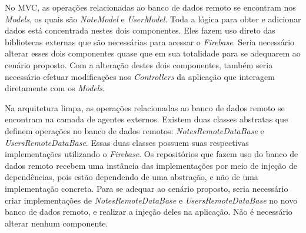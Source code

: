 No MVC, as operações relacionadas ao banco de dados remoto se encontram nos \emph{Models}, os quais são \emph{NoteModel} e \emph{UserModel}.
Toda a lógica para obter e adicionar dados está concentrada nestes dois componentes.
Eles fazem uso direto das bibliotecas externas que são necessárias para acessar o \emph{Firebase}.
Seria necessário alterar esses dois componentes quase que em sua totalidade para se adequarem ao cenário proposto.
Com a alteração destes dois componentes, também seria necessário efetuar modificações nos \emph{Controllers} da aplicação que interagem diretamente com os \emph{Models}.

Na arquitetura limpa, as operações relacionadas ao banco de dados remoto se encontram na camada de agentes externos.
Existem duas classes abstratas que definem operações no banco de dados remotos: \emph{NotesRemoteDataBase} e \emph{UsersRemoteDataBase}.
Essas duas classes possuem suas respectivas implementações utilizando o \emph{Firebase}.
Os repositórios que fazem uso do banco de dados remoto recebem uma instância das implementações por meio de injeção de dependências, pois estão dependendo de uma abstração, e não de uma implementação concreta.
Para se adequar ao cenário proposto, seria necessário criar implementações de \emph{NotesRemoteDataBase} e \emph{UsersRemoteDataBase} no novo banco de dados remoto, e realizar a injeção deles na aplicação.
Não é necessário alterar nenhum componente.